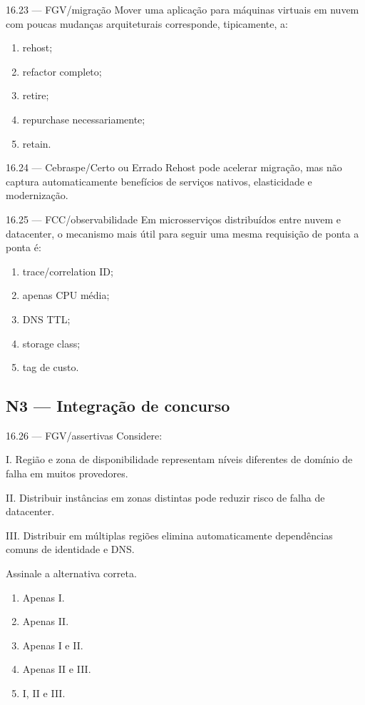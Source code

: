 \begin{questao}{ 16.23 — FGV/migração}
Mover uma aplicação para máquinas virtuais em nuvem com poucas mudanças arquiteturais corresponde, tipicamente, a:
\begin{enumerate}[label=\Alph*)]
\item rehost;
\item refactor completo;
\item retire;
\item repurchase necessariamente;
\item retain.
\end{enumerate}
\end{questao}

\begin{questao}{ 16.24 — Cebraspe/Certo ou Errado}
Rehost pode acelerar migração, mas não captura automaticamente benefícios de serviços nativos, elasticidade e modernização.
\end{questao}

\begin{questao}{ 16.25 — FCC/observabilidade}
Em microsserviços distribuídos entre nuvem e datacenter, o mecanismo mais útil para seguir uma mesma requisição de ponta a ponta é:
\begin{enumerate}[label=\Alph*)]
\item trace/correlation ID;
\item apenas CPU média;
\item DNS TTL;
\item storage class;
\item tag de custo.
\end{enumerate}
\end{questao}

\subsection*{N3 — Integração de concurso}

\begin{questao}{ 16.26 — FGV/assertivas}
Considere:

I. Região e zona de disponibilidade representam níveis diferentes de domínio de falha em muitos provedores.

II. Distribuir instâncias em zonas distintas pode reduzir risco de falha de datacenter.

III. Distribuir em múltiplas regiões elimina automaticamente dependências comuns de identidade e DNS.

Assinale a alternativa correta.
\begin{enumerate}[label=\Alph*)]
\item Apenas I.
\item Apenas II.
\item Apenas I e II.
\item Apenas II e III.
\item I, II e III.
\end{enumerate}
\end{questao}

